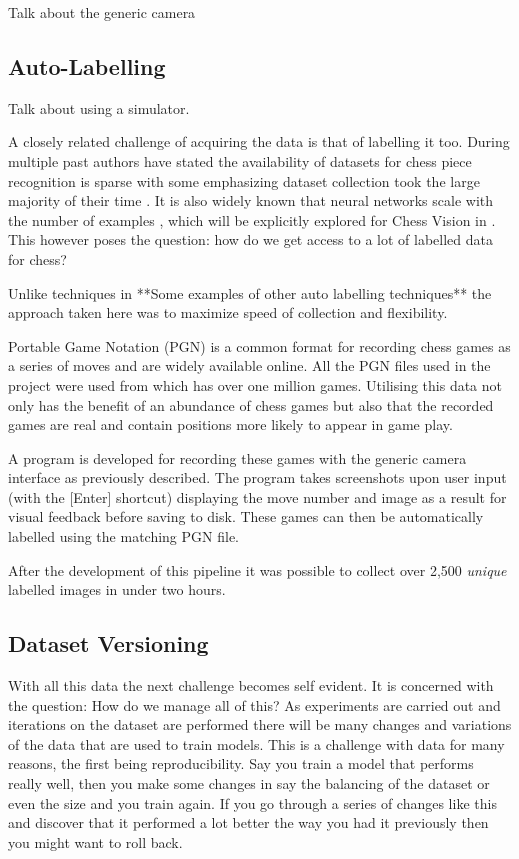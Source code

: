 Talk about the generic camera

\subsection{Auto-Labelling}
Talk about using a simulator.

A closely related challenge of acquiring the data is that of labelling it too. 
During  multiple past authors have stated the availability of 
datasets for chess piece recognition is sparse \cite{} with some emphasizing
dataset collection took the large majority of their time \cite{}.
It is also widely known that neural networks scale with the number of examples \cite{}, 
which will be explicitly explored for Chess Vision in .
This however poses the question: how do we get access to a lot of labelled data 
for chess?

Unlike techniques in \cite{}  **Some examples of other auto labelling techniques**
the approach taken here was to maximize speed of collection and flexibility.

Portable Game Notation (PGN) is a common format for recording chess games as a 
series of moves and are widely available online.  All the PGN files used in the 
project were used from \cite{} which has over one million games.  Utilising this
data not only has the benefit of an abundance of chess games but also that the 
recorded games are real and contain positions more likely to appear in game play. 

A program is developed for recording these games with the generic camera interface
as previously described.  The program takes screenshots upon user input (with the
[Enter] shortcut) displaying the move number and image as a result for visual feedback
before saving to disk.  These games can then be automatically labelled using the matching
PGN file.

After the development of this pipeline it was possible to collect over 2,500 \textit{unique} labelled
images in under two hours.

\subsection{Dataset Versioning}
With all this data the next challenge becomes self evident. It is concerned with the question: How do we manage all of this?
As experiments are carried out and iterations on the dataset are performed there will be many changes and variations of the data
that are used to train models.  This is a challenge with data for many reasons, the first being reproducibility.  Say you train a model
that performs really well, then you make some changes in say the balancing of the dataset or even the size and you train again.  If you go 
through a series of changes like this and discover that it performed a lot better the way you had it previously then you might want to roll back.

